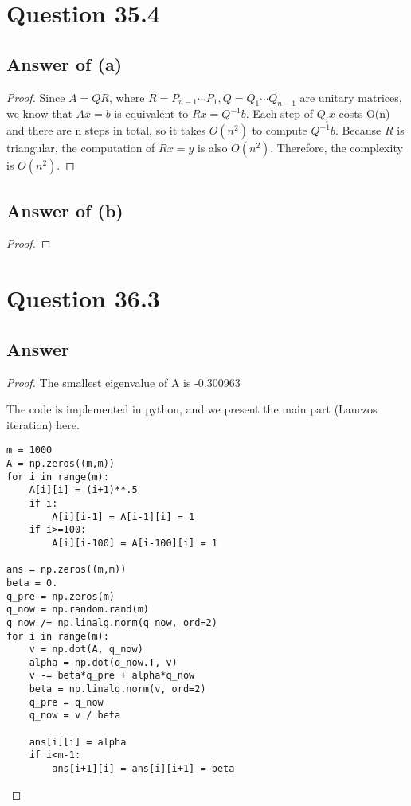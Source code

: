\documentclass[letterpaper,11pt\iffalse ,draft\fi]{article}
\begin{document}
\newpage

\section*{Question 35.4}

\subsection*{Answer of (a)}
\begin{proof}
Since $A=QR$, where $R=P_{n-1}\cdots P_1, Q=Q_1\cdots Q_{n-1}$ are unitary matrices, we know that $Ax=b$ is equivalent to $Rx = Q^{-1}b$. Each step of $Q_ix$ costs O(n) and there are n steps in total, so it takes $O(n^2)$ to compute $Q^{-1}b$. Because $R$ is triangular, the computation of $Rx = y$ is also $O(n^2)$. Therefore, the complexity is $O(n^2)$.
\end{proof}


\subsection*{Answer of (b)}
\begin{proof}
\end{proof}


\newpage

\section*{Question 36.3}

\subsection*{Answer}
\begin{proof}

The smallest eigenvalue of A is -0.300963

The code is implemented in python, and we present the main part (Lanczos iteration) here. \\


\begin{lstlisting}
m = 1000
A = np.zeros((m,m))
for i in range(m):
    A[i][i] = (i+1)**.5
    if i:
        A[i][i-1] = A[i-1][i] = 1
    if i>=100:
        A[i][i-100] = A[i-100][i] = 1
        
ans = np.zeros((m,m))
beta = 0.
q_pre = np.zeros(m)
q_now = np.random.rand(m)
q_now /= np.linalg.norm(q_now, ord=2)
for i in range(m):
    v = np.dot(A, q_now)
    alpha = np.dot(q_now.T, v)
    v -= beta*q_pre + alpha*q_now
    beta = np.linalg.norm(v, ord=2)
    q_pre = q_now
    q_now = v / beta

    ans[i][i] = alpha
    if i<m-1:
        ans[i+1][i] = ans[i][i+1] = beta
\end{lstlisting}

\end{proof}
\end{document}
